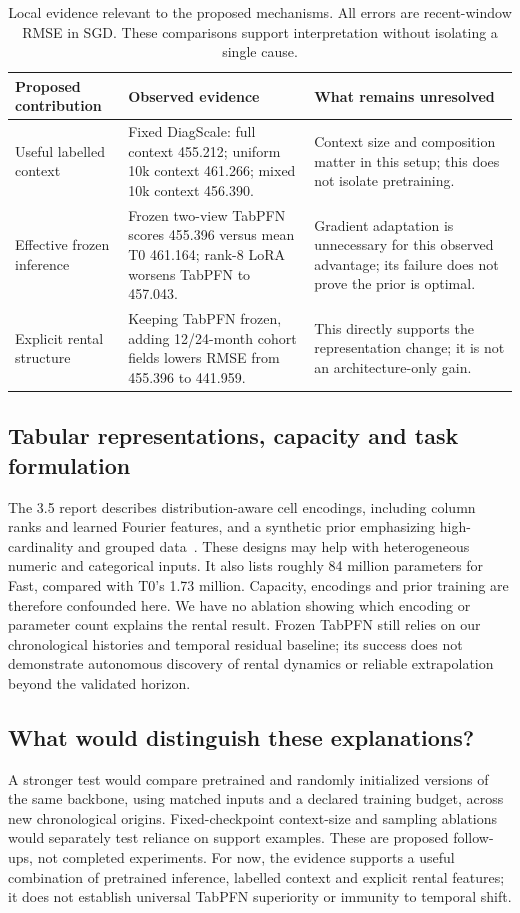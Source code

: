 \documentclass[conference]{IEEEtran}
\begin{document}
\begin{table}[!ht]
\caption{Local evidence relevant to the proposed mechanisms. All errors are recent-window RMSE in SGD. These comparisons support interpretation without isolating a single cause.}
\label{tab:tabpfnmechanisms}
\centering\small
\begin{tabular}{p{}p{}p{}}
\toprule
Proposed contribution & Observed evidence & What remains unresolved\\
\midrule
Useful labelled context & Fixed DiagScale: full context 455.212; uniform 10k context 461.266; mixed 10k context 456.390. & Context size and composition matter in this setup; this does not isolate pretraining.\\[3pt]
Effective frozen inference & Frozen two-view TabPFN scores 455.396 versus mean T0 461.164; rank-8 LoRA worsens TabPFN to 457.043. & Gradient adaptation is unnecessary for this observed advantage; its failure does not prove the prior is optimal.\\[3pt]
Explicit rental structure & Keeping TabPFN frozen, adding 12/24-month cohort fields lowers RMSE from 455.396 to 441.959. & This directly supports the representation change; it is not an architecture-only gain.\\
\bottomrule
\end{tabular}
\end{table}

\subsection{Tabular representations, capacity and task formulation}
The 3.5 report describes distribution-aware cell encodings, including column ranks and learned Fourier features, and a synthetic prior emphasizing high-cardinality and grouped data~\cite{tabpfn35}. These designs may help with heterogeneous numeric and categorical inputs. It also lists roughly 84 million parameters for Fast, compared with T0's 1.73 million. Capacity, encodings and prior training are therefore confounded here. We have no ablation showing which encoding or parameter count explains the rental result. Frozen TabPFN still relies on our chronological histories and temporal residual baseline; its success does not demonstrate autonomous discovery of rental dynamics or reliable extrapolation beyond the validated horizon.

\subsection{What would distinguish these explanations?}
A stronger test would compare pretrained and randomly initialized versions of the same backbone, using matched inputs and a declared training budget, across new chronological origins. Fixed-checkpoint context-size and sampling ablations would separately test reliance on support examples. These are proposed follow-ups, not completed experiments. For now, the evidence supports a useful combination of pretrained inference, labelled context and explicit rental features; it does not establish universal TabPFN superiority or immunity to temporal shift.
\par\endgroup
\clearpage
\end{document}
